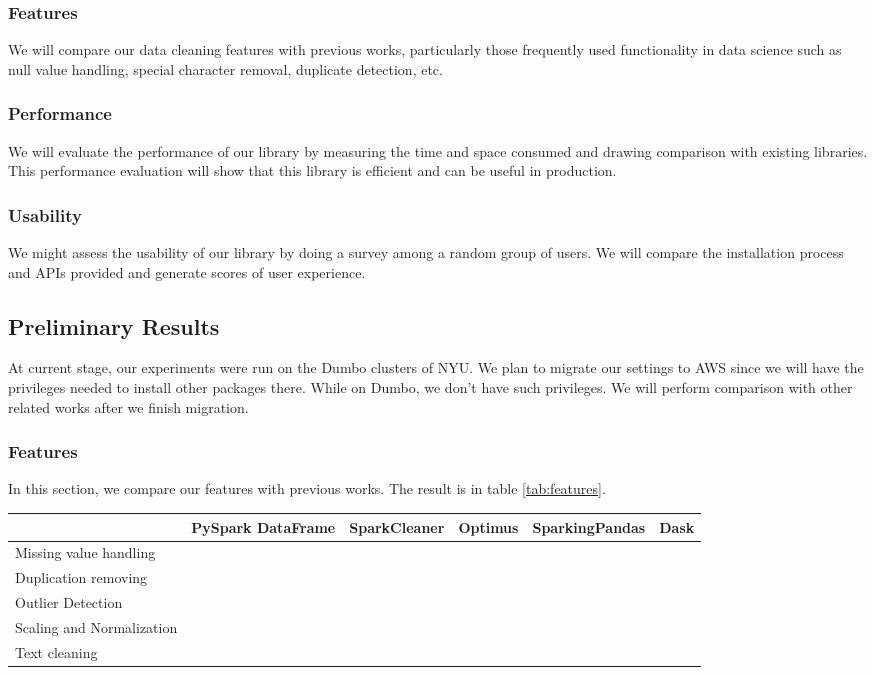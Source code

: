 \documentclass[sigconf]{acmart}
\begin{document}
\subsubsection{Features}
We will compare our data cleaning features with previous works, particularly those frequently used functionality in data science such as null value handling, special character removal, duplicate detection, etc. 
\subsubsection{Performance}
We will evaluate the performance of our library by measuring the time and space consumed and drawing comparison with existing libraries. This performance evaluation will show that this library is efficient and can be useful in production. 
\subsubsection{Usability}
We might assess the usability of our library by doing a survey among a random group of users. We will compare the installation process and APIs provided and generate scores of user experience.

\subsection{Preliminary Results}
At current stage, our experiments were run on the Dumbo clusters of NYU. We plan to migrate our settings to AWS since we will have the privileges needed to install other packages there. While on Dumbo, we don't have such privileges. We will perform comparison with other related works after we finish migration.

\subsubsection{Features}
In this section, we compare our features with previous works. The result is in table \ref{tab:features}.

\begin{table*}
\caption{Evaluation: Feature Comparison}   
\label{tab:features}
\begin{tabular}{lccccc}
				&  PySpark DataFrame 	& SparkCleaner 	& Optimus 	& SparkingPandas 	& Dask	\\
\hline
Missing value handling 	&      \checkmark 	        	& \checkmark   	& 		& 			&	 	\\
Duplication removing   	&      \checkmark 	       	& \checkmark 	&		&			&		\\
Outlier Detection		&				& \checkmark	&		&			&		\\
Scaling and Normalization	&				& \checkmark	&		&			&		\\
Text cleaning		&				& \checkmark	&		&			&		\\
\end{tabular}
\end{table*}
\end{document}
